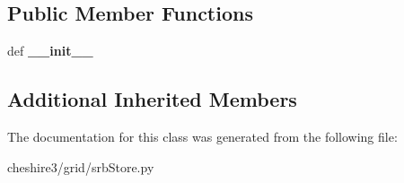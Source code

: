 \subsection*{Public Member Functions}
\begin{DoxyCompactItemize}
\item 
\hypertarget{classcheshire3_1_1grid_1_1srb_store_1_1_caching_srb_document_store_ac3946b4676a3ac81becced3559dc1630}{def {\bfseries \-\_\-\-\_\-init\-\_\-\-\_\-}}\label{classcheshire3_1_1grid_1_1srb_store_1_1_caching_srb_document_store_ac3946b4676a3ac81becced3559dc1630}

\end{DoxyCompactItemize}
\subsection*{Additional Inherited Members}


The documentation for this class was generated from the following file\-:\begin{DoxyCompactItemize}
\item 
cheshire3/grid/srb\-Store.\-py\end{DoxyCompactItemize}
